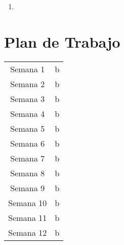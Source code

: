 \documentclass{article}
\begin{document}
\begin{enumerate}
	\item 
\end{enumerate}

\section{Plan de Trabajo}

\begin{table}[h]
	\centering
	\begin{tabular}{|c|p{5cm}|}
		\hline
		Semana 1& b\\
		Semana 2& b\\
		Semana 3& b\\
		Semana 4& b\\
		Semana 5& b\\
		Semana 6& b\\
		Semana 7& b\\
		Semana 8& b\\
		Semana 9& b\\
		Semana 10& b\\
		Semana 11& b\\
		Semana 12& b\\
		\hline
	\end{tabular}
\end{table}
\end{document}

